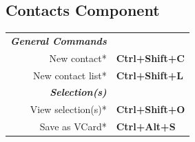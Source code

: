 \documentclass[12pt]{article}
\begin{document}
\begin{landscape}
\begin{center}
\begin{multicols}{2}
	\section*{Contacts Component}
	\begin{tabular*}{4in}{rp{1.5in}}
		\textit{\textbf{General Commands}}	&				\\
		New contact*				& \textbf{Ctrl+Shift+C}		\\
		\vspace{1.5mm}
		New contact list*			& \textbf{Ctrl+Shift+L}		\\
		\textit{\textbf{Selection(s)}}		&				\\
		View selection(s)*			& \textbf{Ctrl+Shift+O}		\\
		Save as VCard*				& \textbf{Ctrl+Alt+S}		\\
	\end{tabular*}
	\end{multicols}
	\end{center}
	\end{landscape}
 
\end{document}
